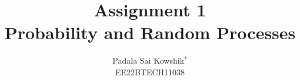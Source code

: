\documentclass[journal,12pt,twocolumn]{IEEEtran}
\theoremstyle{remark}
\begin{document}
%




\vspace{3cm}

\title{
Assignment 1\\Probability and Random Processes
}
\author{Padala Sai Kowshik$^{*}$\\EE22BTECH11038%
	
}	


%
%
%

% 
%
\end{document}
